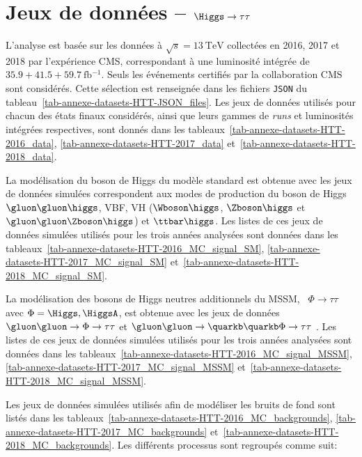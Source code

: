 \chapter{Jeux de données -- $\Higgs\to\tau\tau$}\label{annexe-datasets-HTT}
L'analyse est basée sur les données à $\sqrt{s}=\SI{13}{\TeV}$ collectées en 2016, 2017 et 2018 par l'expérience CMS, correspondant à une luminosité intégrée de $\num{35.9}+\num{41.5}+\SI{59.7}{\femto\barn^{-1}}$.
Seuls les événements certifiés par la collaboration CMS sont considérés. Cette sélection est renseignée dans les fichiers \texttt{JSON} du tableau~\ref{tab-annexe-datasets-HTT-JSON_files}.
Les jeux de données utilisés pour chacun des états finaux considérés, ainsi que leurs gammes de \emph{runs} et luminosités intégrées respectives, sont donnés dans les tableaux~\ref{tab-annexe-datasets-HTT-2016_data}, \ref{tab-annexe-datasets-HTT-2017_data} et~\ref{tab-annexe-datasets-HTT-2018_data}.
\par
La modélisation du boson de Higgs du modèle standard
est obtenue avec les jeux de données simulées correspondent aux modes de production du boson de Higgs
$\gluon\gluon\higgs$,
VBF,
VH ($\Wboson\higgs$, $\Zboson\higgs$ et $\gluon\gluon\Zboson\higgs$) et
$\ttbar\higgs$.
Les listes de ces jeux de données simulées utilisés pour les trois années analysées sont données dans les tableaux~\ref{tab-annexe-datasets-HTT-2016_MC_signal_SM}, \ref{tab-annexe-datasets-HTT-2017_MC_signal_SM} et~\ref{tab-annexe-datasets-HTT-2018_MC_signal_SM}.
\par
La modélisation des bosons de Higgs neutres additionnels du MSSM,
\ie\ $\Phi\to\tau\tau$ avec $\Phi=\Higgs,\HiggsA$,
est obtenue avec les jeux de données
$\gluon\gluon\to\Phi\to\tau\tau$ %
et
$\gluon\gluon\to\quarkb\quarkb\Phi\to\tau\tau$ .%
Les listes de ces jeux de données simulées utilisés pour les trois années analysées sont données dans les tableaux~\ref{tab-annexe-datasets-HTT-2016_MC_signal_MSSM}, \ref{tab-annexe-datasets-HTT-2017_MC_signal_MSSM} et~\ref{tab-annexe-datasets-HTT-2018_MC_signal_MSSM}.
\par
Les jeux de données simulées utilisés afin de modéliser les bruits de fond sont listés dans les tableaux~\ref{tab-annexe-datasets-HTT-2016_MC_backgrounds}, \ref{tab-annexe-datasets-HTT-2017_MC_backgrounds} et~\ref{tab-annexe-datasets-HTT-2018_MC_backgrounds}.
Les différents processus sont regroupés comme suit:

\vspace{.5\baselineskip}

